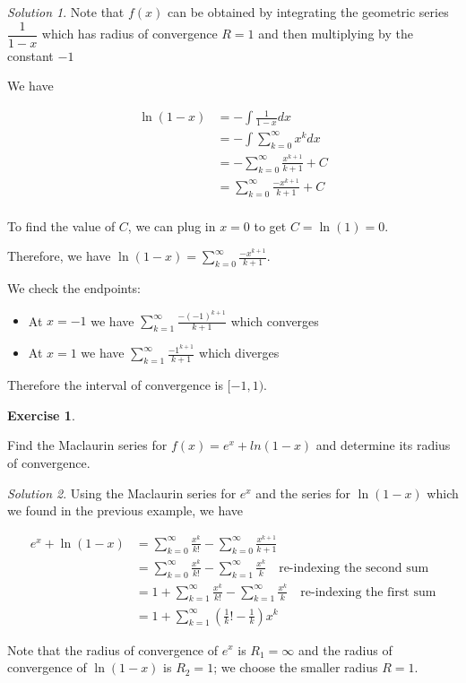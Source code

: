\documentclass[
]{book}
\providecommand{\tightlist}{%
  \setlength{\itemsep}{0pt}\setlength{\parskip}{0pt}}
\theoremstyle{definition}
\theoremstyle{definition}
\theoremstyle{definition}
\newtheorem{exercise}{Exercise}[chapter]
\theoremstyle{definition}
\theoremstyle{remark}
\newtheorem*{solution}{Solution}
\begin{document}
\begin{solution}

Note that \(f(x)\) can be obtained by integrating the geometric series \(\dfrac{1}{1-x}\) which has radius of convergence \(R=1\) and then multiplying by the constant \(-1\)

We have

\begin{align*}
\ln(1-x) &= -\int \frac{1}{1-x}dx\\
&= -\int \sum_{k=0}^\infty x^k dx\\
&= -\sum_{k=0}^\infty \frac{x^{k+1}}{k+1} +C \\
&= \sum_{k=0}^\infty \frac{-x^{k+1}}{k+1} +C \\
\end{align*}

To find the value of \(C\), we can plug in \(x=0\) to get \(C=\ln(1)=0\).

Therefore, we have \(\ln(1-x)=\sum_{k=0}^\infty \frac{-x^{k+1}}{k+1}\).

We check the endpoints:

\begin{itemize}
\tightlist
\item
  At \(x=-1\) we have \(\sum_{k=1}^\infty \frac{-(-1)^{k+1}}{k+1}\) which converges
\item
  At \(x=1\) we have \(\sum_{k=1}^\infty \frac{-1^{k+1}}{k+1}\) which diverges
\end{itemize}

Therefore the interval of convergence is \([-1,1)\).

\end{solution}

\begin{exercise}
\protect\hypertarget{exr:unlabeled-div-250}{}\label{exr:unlabeled-div-250}

Find the Maclaurin series for \(f(x)=e^x+ln(1-x)\) and determine its radius of convergence.

\end{exercise}

\begin{solution}

Using the Maclaurin series for \(e^x\) and the series for \(\ln(1-x)\) which we found in the previous example, we have

\begin{align*}
e^x+\ln(1-x) &= \sum_{k=0}^\infty \frac{x^k}{k!} - \sum_{k=0}^\infty \frac{x^{k+1}}{k+1}\\
&=  \sum_{k=0}^\infty \frac{x^k}{k!} -  \sum_{k=1}^\infty \frac{x^k}{k} \quad\mbox{re-indexing the second sum}\\
&= 1+ \sum_{k=1}^\infty \frac{x^k}{k!} -  \sum_{k=1}^\infty \frac{x^k}{k} \quad\mbox{re-indexing the first sum}\\
&= 1+\sum_{k=1}^\infty \left ( \frac{1}k! -\frac{1}{k} \right) x^k 
\end{align*}

Note that the radius of convergence of \(e^x\) is \(R_1=\infty\) and the radius of convergence of \(\ln(1-x)\) is \(R_2=1\); we choose the smaller radius \(R=1\).

\end{solution}
\end{document}
